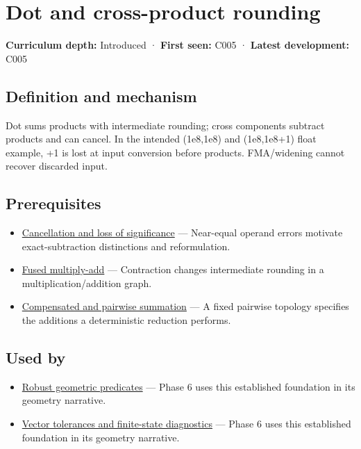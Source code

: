 \hypertarget{appendix-5aef4f13483a}{}\label{referencestart:appendix-5aef4f13483a}
\section{Dot and cross-product rounding}\label{appendix-5aef4f13483a-dot-and-cross-product-rounding}

\textbf{Curriculum depth:} Introduced · \textbf{First seen:} C005 · \textbf{Latest development:} C005

\subsection{Definition and mechanism}\label{appendix-5aef4f13483a-definition-and-mechanism}

Dot sums products with intermediate rounding; cross components subtract products and can cancel. In the intended (1e8,1e8) and (1e8,1e8+1) float example, +1 is lost at input conversion before products. FMA/widening cannot recover discarded input.

\subsection{Prerequisites}\label{appendix-5aef4f13483a-prerequisites}

\begin{itemize}
\tightlist
\item
  \hyperref[appendix-a2773a6a2f9d]{Cancellation and loss of significance} --- Near-equal operand errors motivate exact-subtraction distinctions and reformulation.
\item
  \hyperref[appendix-41e8ef22a21e]{Fused multiply-add} --- Contraction changes intermediate rounding in a multiplication/addition graph.
\item
  \hyperref[appendix-df318da57389]{Compensated and pairwise summation} --- A fixed pairwise topology specifies the additions a deterministic reduction performs.
\end{itemize}

\subsection{Used by}\label{appendix-5aef4f13483a-used-by}

\begin{itemize}
\tightlist
\item
  \hyperref[appendix-341296fb3f64]{Robust geometric predicates} --- Phase 6 uses this established foundation in its geometry narrative.
\item
  \hyperref[appendix-b5b83329215b]{Vector tolerances and finite-state diagnostics} --- Phase 6 uses this established foundation in its geometry narrative.
\end{itemize}

